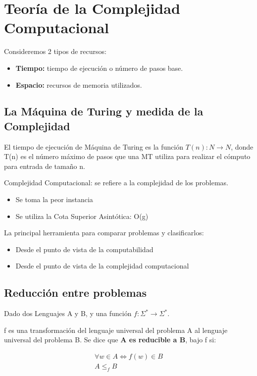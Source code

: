 \chapter{Teoría de la Complejidad Computacional}\label{ch:teoría-de-la-complejidad-computacional}
Consideremos 2 tipos de recursos:
\begin{itemize}
	\item \textbf{Tiempo:} tiempo de ejecución o número de pasos base.
	\item \textbf{Espacio:} recursos de memoria utilizados.
\end{itemize}

\section{La Máquina de Turing y medida de la Complejidad}
El tiempo de ejecución de Máquina de Turing es la función $T(n): N \rightarrow N$, donde T(n) es el número máximo de pasos que una MT utiliza para realizar el cómputo para entrada de tamaño n.

Complejidad Computacional: se refiere a la complejidad de los problemas.
\begin{itemize}
	\item Se toma la peor instancia
	\item Se utiliza la Cota Superior  Asintótica: O(g)
\end{itemize}

La principal herramienta para comparar problemas y clasificarlos:
\begin{itemize}
	\item Desde el punto de vista de la computabilidad
	\item Desde el punto de vista de la complejidad computacional
\end{itemize}

\section{Reducción entre problemas}
Dado dos Lenguajes A y B, y una función $f: \Sigma^* \rightarrow \Sigma^*$.

f es una transformación del lenguaje universal del problema A al lenguaje universal del problema B. Se dice que \textbf{A es reducible a B}, bajo f si:

$$\begin{matrix}
		\forall w \in A \Leftrightarrow f(w)\in B \\
		A \leq_f B
	\end{matrix}$$

